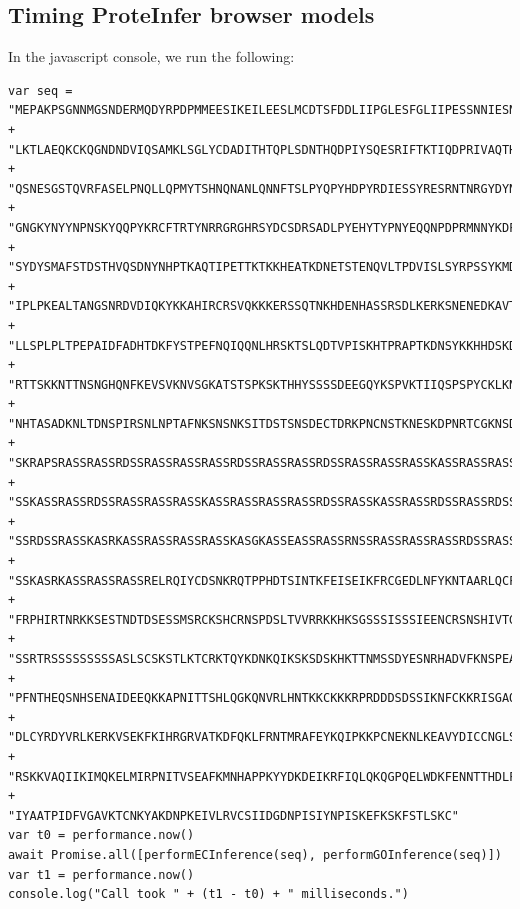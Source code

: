 \subsection{Timing ProteInfer browser models}
\label{sup:js_timing}
In the javascript console, we run the following:
\begin{verbatim}
var seq = "MEPAKPSGNNMGSNDERMQDYRPDPMMEESIKEILEESLMCDTSFDDLIIPGLESFGLIIPESSNNIESNNVEEGSDGE" +
"LKTLAEQKCKQGNDNDVIQSAMKLSGLYCDADITHTQPLSDNTHQDPIYSQESRIFTKTIQDPRIVAQTHRQCTSSASNL" + 
"QSNESGSTQVRFASELPNQLLQPMYTSHNQNANLQNNFTSLPYQPYHDPYRDIESSYRESRNTNRGYDYNFRHHPYRPRG" + 
"GNGKYNYYNPNSKYQQPYKRCFTRTYNRRGRGHRSYDCSDRSADLPYEHYTYPNYEQQNPDPRMNNYKDFTQLTNKFNFE" + 
"SYDYSMAFSTDSTHVQSDNYNHPTKAQTIPETTKTKKHEATKDNETSTENQVLTPDVISLSYRPSSYKMDIIKKIYDTDV" + 
"IPLPKEALTANGSNRDVDIQKYKKAHIRCRSVQKKKERSSQTNKHDENHASSRSDLKERKSNENEDKAVTKARDFSKLNP" + 
"LLSPLPLTPEPAIDFADHTDKFYSTPEFNQIQQNLHRSKTSLQDTVPISKHTPRAPTKDNSYKKHHDSKDNYPKMKHSPG" + 
"RTTSKKNTTNSNGHQNFKEVSVKNVSGKATSTSPKSKTHHYSSSSDEEGQYKSPVKTIIQSPSPYCKLKNPSIMDKNSAK" + 
"NHTASADKNLTDNSPIRSNLNPTAFNKSNSNKSITDSTSNSDECTDRKPNCNSTKNESKDPNRTCGKNSDKHLSKSCTMA" + 
"SKRAPSRASSRASSRDSSRASSRASSRASSRDSSRASSRASSRDSSRASSRASSRASSKASSRASSRASSRASSRDSSRA" + 
"SSKASSRASSRDSSRASSRASSRASSKASSRASSRASSRASSRDSSRASSKASSRASSRDSSRASSRDSSRDSSRASSRA" + 
"SSRDSSRASSKASRKASSRASSRASSRASSKASGKASSEASSRASSRNSSRASSRASSRASSRDSSRASSRASSRDSSRA" + 
"SSKASRKASSRASSRASSRELRQIYCDSNKRQTPPHDTSINTKFEISEIKFRCGEDLNFYKNTAARLQCFNHNDQFYNPR" + 
"FRPHIRTNRKKSESTNDTDSESSMSRCKSHCRNSPDSLTVVRRKKHKSGSSSISSSIEENCRSNSHIVTGKEKFTPFYYQ" + 
"SSRTRSSSSSSSSSASLSCSKSTLKTCRKTQYKDNKQIKSKSDSKHKTTNMSSDYESNRHADVFKNSPEAGEKFPLHNSS" + 
"PFNTHEQSNHSENAIDEEQKKAPNITTSHLQGKQNVRLHNTKKCKKKRPRDDDSDSSIKNFCKKRISGAQKTESEVSEPD" + 
"DLCYRDYVRLKERKVSEKFKIHRGRVATKDFQKLFRNTMRAFEYKQIPKKPCNEKNLKEAVYDICCNGLSNNAAIIMYFT" + 
"RSKKVAQIIKIMQKELMIRPNITVSEAFKMNHAPPKYYDKDEIKRFIQLQKQGPQELWDKFENNTTHDLFTRHSDVKTMI" + 
"IYAATPIDFVGAVKTCNKYAKDNPKEIVLRVCSIIDGDNPISIYNPISKEFKSKFSTLSKC"
var t0 = performance.now()
await Promise.all([performECInference(seq), performGOInference(seq)])
var t1 = performance.now()
console.log("Call took " + (t1 - t0) + " milliseconds.")
    
\end{verbatim}
